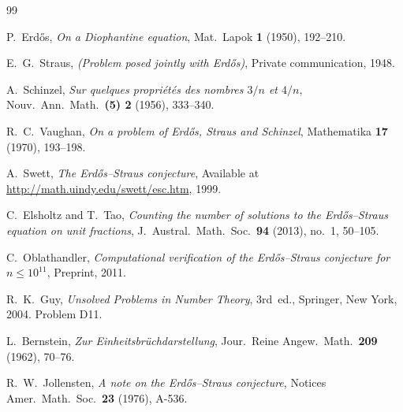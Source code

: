 \documentclass[12pt,a4paper]{amsart}
\theoremstyle{definition}
\begin{document}
\begin{thebibliography}{99}

P.~Erd\H{o}s,
\emph{On a Diophantine equation},
Mat.\ Lapok \textbf{1} (1950), 192--210.

E.~G.~Straus,
\emph{(Problem posed jointly with Erd\H{o}s)},
Private communication, 1948.

A.~Schinzel,
\emph{Sur quelques propri\'et\'es des nombres $3/n$ et $4/n$},
Nouv.\ Ann.\ Math.\ \textbf{(5) 2} (1956), 333--340.

R.~C.~Vaughan,
\emph{On a problem of Erd\H{o}s, Straus and Schinzel},
Mathematika \textbf{17} (1970), 193--198.

A.~Swett,
\emph{The Erd\H{o}s--Straus conjecture},
Available at \url{http://math.uindy.edu/swett/esc.htm}, 1999.

C.~Elsholtz and T.~Tao,
\emph{Counting the number of solutions to the Erd\H{o}s--Straus equation on unit fractions},
J.~Austral.\ Math.\ Soc.\ \textbf{94} (2013), no.~1, 50--105.

C.~Oblathandler,
\emph{Computational verification of the Erd\H{o}s--Straus conjecture for $n \leq 10^{11}$},
Preprint, 2011.

R.~K.~Guy,
\emph{Unsolved Problems in Number Theory}, 3rd~ed.,
Springer, New York, 2004.
Problem D11.

L.~Bernstein,
\emph{Zur Einheitsbr\"{u}chdarstellung}, Jour.\ Reine Angew.\ Math.\
\textbf{209} (1962), 70--76.

R.~W.~Jollensten,
\emph{A note on the Erd\H{o}s--Straus conjecture},
Notices Amer.\ Math.\ Soc.\ \textbf{23} (1976), A-536.

\end{thebibliography}
\end{document}
